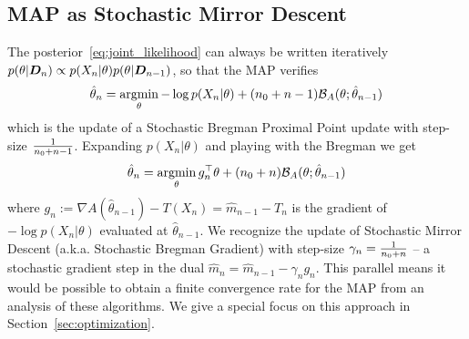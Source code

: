 \documentclass[twoside]{article}
\newcommand{\logpart}{A}
\newcommand{\bregman}{\cB_\logpart}
\newcommand{\nat}{\theta}
\newcommand{\m}{m}
\newcommand{\lr}{\gamma} %
\begin{document}
\subsection{MAP as Stochastic Mirror Descent}
\label{ssec:MAP=SMD}
The posterior~\eqref{eq:joint_likelihood} can always be written iteratively $p(\nat | \mD_n) \propto p(X_n | \nat) p(\nat | \mD_{n-1})$, so that the MAP verifies
\begin{align*}
	\hat \nat_{n}
	= \argmin_\nat - \log p(X_{n} | \nat) + (n_0 + n -1) \bregman(\nat; \hat \nat_{n-1})
\end{align*}
which is the update of a Stochastic Bregman Proximal Point update with step-size $\frac{1}{n_0 + n - 1}$. Expanding $p(X_{n} | \nat)$ and  playing with the Bregman we get
\begin{align}
		\hat \nat_{n}
	= \argmin_\nat g_{n}^\top \nat + (n_0 + n) \bregman(\nat; \hat \nat_{n-1})
    \label{eq:SMD}
\end{align}
where $g_{n} := \nabla\logpart(\hat \nat_{n-1}) - T(X_n) = \hat \m_{n-1} - T_n$ is the gradient of $-\log p(X_{n} | \nat)$ evaluated at $\hat \nat_{n-1}$. 
We recognize the update of Stochastic Mirror Descent (a.k.a. Stochastic Bregman Gradient) with step-size $\lr_n = \inv{n_0 + n}$ -- a stochastic gradient step in the dual $\hat \m_n = \hat \m_{n-1} - \lr_n g_n$.
This parallel means it would be possible to obtain a finite convergence rate for the  MAP from an analysis of these algorithms. 
We give a special focus on this approach in Section~\ref{sec:optimization}.
\end{document}
